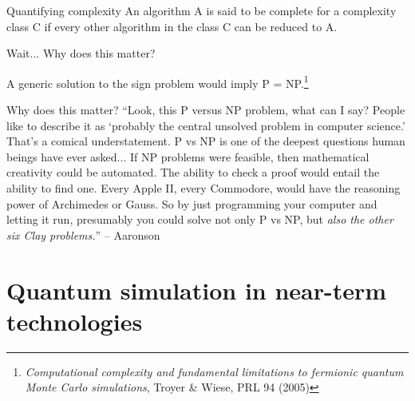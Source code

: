 \documentclass[10pt]{beamer}
\begin{document}
\begin{frame}{Quantifying complexity}
An algorithm A is said to be complete for a complexity class C if every other algorithm in the class C can be reduced to A.

Wait... Why does this matter?
\begin{center}
    A generic solution to the sign problem would imply P = NP.\footnote{\emph{Computational complexity and fundamental limitations to fermionic quantum Monte Carlo simulations}, Troyer \& Wiese, PRL 94 (2005)}
\end{center}



\end{frame}


\begin{frame}{Why does this matter?}
    ``Look, this P versus NP problem, what can I say? People like to describe it as `probably the central unsolved problem in computer science.' That's a comical understatement. P vs NP is one of the deepest questions human beings have ever asked... If NP problems were  feasible, then mathematical creativity could be automated. The ability to check a proof would entail the ability to find one. Every Apple II, every Commodore, would have the reasoning power of Archimedes or Gauss. So by just programming your computer and letting it run, presumably you could solve not only P vs NP, but \emph{also the other six Clay problems.}'' -- Aaronson
\end{frame}




\section{Quantum simulation in near-term technologies}
\end{document}
